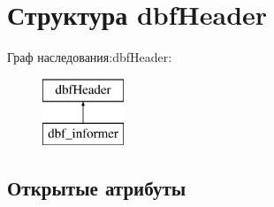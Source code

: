 \hypertarget{structdbf_header}{\section{Структура dbf\-Header}
\label{structdbf_header}
}
Граф наследования\-:dbf\-Header\-:\begin{figure}[H]
\begin{center}
\leavevmode
\includegraphics[height=2.000000cm]{structdbf_header}
\end{center}
\end{figure}
\subsection*{Открытые атрибуты}
